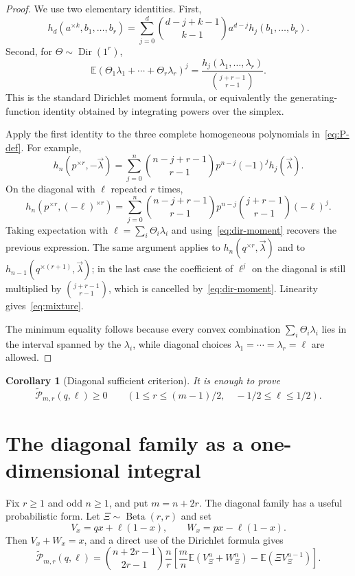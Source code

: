 \documentclass[11pt]{article}
\newtheorem{corollary}[theorem]{Corollary}
\newcommand{\E}{\mathbb E}
\newcommand{\wtP}{\widetilde{\mathcal P}}
\newcommand{\Dir}{\operatorname{Dir}}
\newcommand{\Betad}{\operatorname{Beta}}
\begin{document}
\begin{proof}
We use two elementary identities.  First,
\[
        h_d(a^{\times k},b_1,\ldots,b_r)
        =\sum_{j=0}^d\binom{d-j+k-1}{k-1}a^{d-j}h_j(b_1,\ldots,b_r).
\]
Second, for $\Theta\sim\Dir(1^r)$,
\begin{equation}\label{eq:dir-moment}
        \E(\Theta_1\lambda_1+\cdots+\Theta_r\lambda_r)^j
        =\frac{h_j(\lambda_1,\ldots,\lambda_r)}{\binom{j+r-1}{r-1}}.
\end{equation}
This is the standard Dirichlet moment formula, or equivalently the generating-function identity obtained by integrating powers over the simplex.

Apply the first identity to the three complete homogeneous polynomials in~\eqref{eq:P-def}.  For example,
\[
        h_n(p^{\times r},-\vec\lambda)
        =\sum_{j=0}^n\binom{n-j+r-1}{r-1}p^{n-j}(-1)^jh_j(\vec\lambda).
\]
On the diagonal with $\ell$ repeated $r$ times,
\[
        h_n(p^{\times r},(-\ell)^{\times r})
        =\sum_{j=0}^n\binom{n-j+r-1}{r-1}p^{n-j}\binom{j+r-1}{r-1}(-\ell)^j.
\]
Taking expectation with $\ell=\sum_i\Theta_i\lambda_i$ and using~\eqref{eq:dir-moment} recovers the previous expression.  The same argument applies to $h_n(q^{\times r},\vec\lambda)$ and to $h_{n-1}(q^{\times(r+1)},\vec\lambda)$; in the last case the coefficient of $\ell^j$ on the diagonal is still multiplied by $\binom{j+r-1}{r-1}$, which is cancelled by~\eqref{eq:dir-moment}.  Linearity gives~\eqref{eq:mixture}.

The minimum equality follows because every convex combination $\sum_i\Theta_i\lambda_i$ lies in the interval spanned by the $\lambda_i$, while diagonal choices $\lambda_1=\cdots=\lambda_r=\ell$ are allowed.
\end{proof}

\begin{corollary}[Diagonal sufficient criterion]\label{cor:diagonal}
It is enough to prove
\[
        \wtP_{m,r}(q,\ell)\ge0
        \qquad
        (1\le r\le(m-1)/2,\quad -1/2\le\ell\le1/2).
\]
\end{corollary}

\section{The diagonal family as a one-dimensional integral}\label{sec:kernel}

Fix $r\ge1$ and odd $n\ge1$, and put $m=n+2r$.  The diagonal family has a useful probabilistic form.  Let $\Xi\sim\Betad(r,r)$ and set
\[
        V_x=qx+\ell(1-x),
        \qquad
        W_x=px-\ell(1-x).
\]
Then $V_x+W_x=x$, and a direct use of the Dirichlet formula gives
\begin{equation}\label{eq:G-form}
        \wtP_{m,r}(q,\ell)=
        \binom{n+2r-1}{2r-1}\frac nr
        \left[
        \frac mn\E(V_\Xi^n+W_\Xi^n)-\E(\Xi V_\Xi^{n-1})
        \right].
\end{equation}
\end{document}
